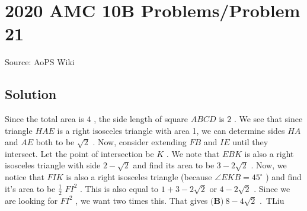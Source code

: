 \documentclass[12pt]{article}
\begin{document}
\section*{{2020 AMC 10B Problems/Problem 21}}
Source: AoPS Wiki

\subsection*{Solution}
Since the total area is $4$ , the side length of square $ABCD$ is $2$ . We see that since triangle $HAE$ is a right isosceles triangle with area 1, we can determine sides $HA$ and $AE$ both to be $\sqrt{2}$ . Now, consider extending $FB$ and $IE$ until they intersect. Let the point of intersection be $K$ . We note that $EBK$ is also a right isosceles triangle with side $2-\sqrt{2}$ and find its area to be $3-2\sqrt{2}$ . Now, we notice that $FIK$ is also a right isosceles triangle (because $\angle EKB=45^\circ$ ) and find it's area to be $\frac{1}{2}$ $FI^2$ . This is also equal to $1+3-2\sqrt{2}$ or $4-2\sqrt{2}$ . Since we are looking for $FI^2$ , we want two times this. That gives $\boxed{\textbf{(B)}\ 8-4\sqrt{2}}$ .~TLiu
\end{document}

